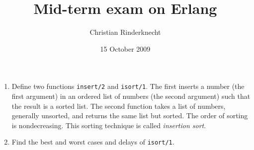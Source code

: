 \documentclass[11pt,a4paper]{article}
\title{Mid-term exam on Erlang}
\author{Christian Rinderknecht}
\date{15 October 2009}
\newcommand\erlcode[1]{\texttt{#1}}
\begin{document}
\maketitle

\thispagestyle{empty}

\begin{enumerate}

  \item Define two functions \erlcode{insert/2} and
    \erlcode{isort/1}. The first inserts a number (the first argument)
    in an ordered list of numbers (the second argument) such that the
    result is a sorted list. The second function takes a list of
    numbers, generally unsorted, and returns the same list but
    sorted. The order of sorting is nondecreasing. This sorting
    technique is called \emph{insertion sort}.

  \item Find the best and worst cases and delays of \erlcode{isort/1}.

\end{enumerate}
\end{document}
